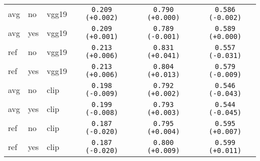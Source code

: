 \begin{tabular}{|l|l|l|c|c|c|}
avg & no & vgg19 & \texttt{0.209} {\color{green}\texttt{(+0.002)}} & \texttt{0.790} {\color{black}\texttt{(+0.000)}} & \texttt{0.586} {\color{red}\texttt{(-0.002)}} \\
avg & yes & vgg19 & \texttt{0.209} {\color{green}\texttt{(+0.001)}} & \texttt{0.789} {\color{green}\texttt{(-0.001)}} & \texttt{0.589} {\color{green}\texttt{(+0.000)}} \\
ref & no & vgg19 & \texttt{0.213} {\color{green}\texttt{(+0.006)}} & \texttt{0.831} {\color{red}\texttt{(+0.041)}} & \texttt{0.557} {\color{red}\texttt{(-0.031)}} \\
ref & yes & vgg19 & \texttt{0.213} {\color{green}\texttt{(+0.006)}} & \texttt{0.804} {\color{red}\texttt{(+0.013)}} & \texttt{0.579} {\color{red}\texttt{(-0.009)}} \\
avg & no & clip & \texttt{0.198} {\color{red}\texttt{(-0.009)}} & \texttt{0.792} {\color{red}\texttt{(+0.002)}} & \texttt{0.546} {\color{red}\texttt{(-0.043)}} \\
avg & yes & clip & \texttt{0.199} {\color{red}\texttt{(-0.008)}} & \texttt{0.793} {\color{red}\texttt{(+0.003)}} & \texttt{0.544} {\color{red}\texttt{(-0.045)}} \\
ref & no & clip & \texttt{0.187} {\color{red}\texttt{(-0.020)}} & \texttt{0.795} {\color{red}\texttt{(+0.004)}} & \texttt{0.595} {\color{green}\texttt{(+0.007)}} \\
ref & yes & clip & \texttt{0.187} {\color{red}\texttt{(-0.020)}} & \texttt{0.800} {\color{red}\texttt{(+0.009)}} & \texttt{0.599} {\color{green}\texttt{(+0.011)}} \\
\hline
\end{tabular}